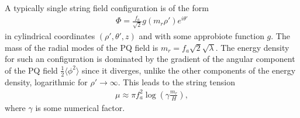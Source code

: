 \documentclass[twoside,a4paper, 12pt]{article}
\numberwithin{equation}{section}
\begin{document}

\noindent
A typically single string field configuration is of the form \cite[Eq. 7]{GorghettoAttractivStrings}
\begin{align}
    \label{eq:cosmic_string_field}
    \Phi = \frac{f_a}{\sqrt{2}} g(m_r \rho') e^{i \theta'}
\end{align}
in cylindrical coordinates $(\rho', \theta', z)$ and with some approbiote function $g$.
The mass of the radial modes of the PQ field is $m_r = f_a \sqrt{2} \sqrt{\lambda}$.
The energy density for such an configuration is dominated by the gradient of the angular component of the PQ field
$\frac{1}{2} \langle \phi^2 \rangle$ since it diverges, unlike the other components of the energy density,
logarithmic for $\rho' \rightarrow \infty$. This leads to the string tension \cite[Eq. 1]{GorghettoAttractivStrings}
\begin{align}
    \mu \approx \pi f_a^2 \log \left( \gamma \frac{m_r}{H} \right),
\end{align}
where $\gamma$ is some numerical factor.
\end{document}
